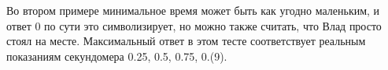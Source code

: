 \begin{problem}
\Examples

\begin{example}
%
%
%
%
\end{example}

\Explanation

Во втором примере минимальное время может быть как угодно маленьким, и ответ 0 по сути это символизирует, но можно также считать, что Влад просто стоял на месте. Максимальный ответ в этом тесте соответствует реальным показаниям секундомера 0.25, 0.5, 0.75, 0.(9).

\end{problem}